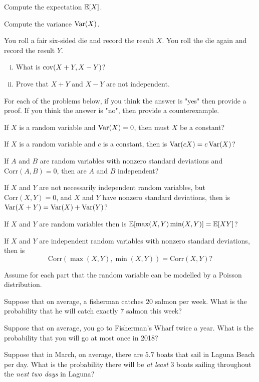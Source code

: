 \documentclass[11pt]{article}
\begin{document}
\begin{Parts}

\Part Compute the expectation $\operatorname{\mathbb{E}}[X]$.

\Part Compute the variance $\operatorname{Var}(X)$.

\end{Parts}
\pagebreak
{}

\begin{Parts}
	\Part You roll a fair six-sided die and record the result $X$. You roll the die again and record the result $Y$. 
	
	\begin{enumerate}[(i)]
		\item What is $\operatorname{cov} (X+Y, X-Y)$? 
		\item Prove that $X+Y$ and $X-Y$ are not independent.
	\end{enumerate}

	
	For each of the problems below, if you think the answer is "yes" then provide a proof. If you think the answer is "no", then provide a counterexample.
	
	\Part If $X$ is a random variable and $\operatorname{Var} (X) = 0$, then must $X$ be a constant?
	

	\Part If $X$ is a random variable and $c$ is a constant, then is $\operatorname{Var} (cX) = c \operatorname{Var} (X)$?
	

	\Part If $A$ and $B$ are random variables with nonzero standard deviations and $\text{Corr} (A, B) = 0$, then are $A$ and $B$ independent?
	

	\Part If $X$ and $Y$ are not necessarily independent random variables, but $\text{Corr} (X, Y) = 0$, and $X$ and $Y$ have nonzero standard deviations, then is $\operatorname{Var} (X+Y) = \operatorname{Var}(X) + \operatorname{Var}(Y)$?
	

	\Part If $X$ and $Y$ are random variables then is $\operatorname{\mathbb{E}}[\max (X, Y) \min (X, Y)] = \operatorname{\mathbb{E}}[X Y]$?
	

	\Part If $X$ and $Y$ are independent random variables with nonzero standard deviations, then is $$\text{Corr} (\max (X, Y), \min (X, Y)) = \text{Corr} (X, Y) ?$$
	
\end{Parts}
\pagebreak
{}

Assume for each part that the random variable can be modelled by a Poisson distribution.

\begin{Parts}
	\Part Suppose that on average, a fisherman catches $20$ salmon per week. What is the probability that he will catch exactly $7$ salmon this week?
    
	
	\Part Suppose that on average, you go to Fisherman's Wharf twice a year. What is the probability that you will go at most once in 2018?
    

	\Part Suppose that in March, on average, there are $5.7$ boats that sail in Laguna Beach per day. What is the probability there will be \textit{at least} $3$ boats sailing throughout the \textit{next two days} in Laguna?
    
	
\end{Parts}
\pagebreak
{}
\end{document}

